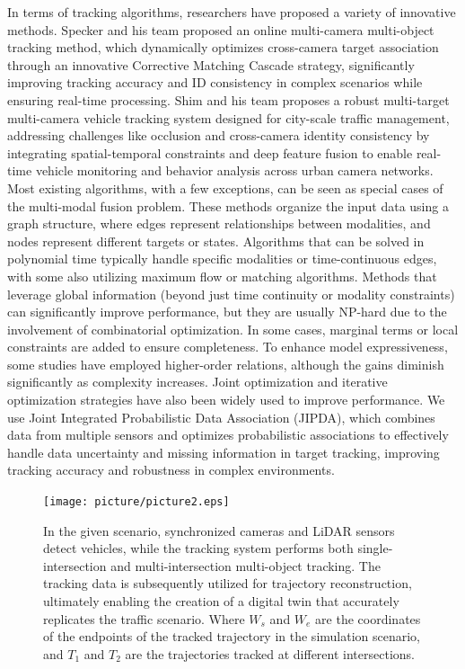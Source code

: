 \documentclass[journal,twoside,web]{ieeecolor}
\begin{document}
In terms of tracking algorithms, researchers have proposed a variety of innovative methods.
Specker and his team proposed an online multi-camera multi-object tracking method, which dynamically optimizes cross-camera target association through an innovative Corrective Matching Cascade strategy, significantly improving tracking accuracy and ID consistency in complex scenarios while ensuring real-time processing\cite{Alpher24e}.
Shim and his team proposes a robust multi-target multi-camera vehicle tracking system designed for city-scale traffic management, addressing challenges like occlusion and cross-camera identity consistency by integrating spatial-temporal constraints and deep feature fusion to enable real-time vehicle monitoring and behavior analysis across urban camera networks\cite{Alpher21e}.
Most existing algorithms, with a few exceptions, can be seen as special cases of the multi-modal fusion problem. 
These methods organize the input data using a graph structure, where edges represent relationships between modalities, and nodes represent different targets or states. 
Algorithms that can be solved in polynomial time typically handle specific modalities or time-continuous edges, with some also utilizing maximum flow or matching algorithms. 
Methods that leverage global information (beyond just time continuity or modality constraints) can significantly improve performance, but they are usually NP-hard due to the involvement of combinatorial optimization. 
In some cases, marginal terms or local constraints are added to ensure completeness. 
To enhance model expressiveness, some studies have employed higher-order relations, although the gains diminish significantly as complexity increases. 
Joint optimization and iterative optimization strategies have also been widely used to improve performance.
We use Joint Integrated Probabilistic Data Association (JIPDA), which combines data from multiple sensors and optimizes probabilistic associations to effectively handle data uncertainty and missing information in target tracking, improving tracking accuracy and robustness in complex environments.

\begin{figure}[t]
	\centerline{\texttt{[image: picture/picture2.eps]}}
	\caption{In the given scenario, synchronized cameras and LiDAR sensors detect vehicles, while the tracking system performs both single-intersection and multi-intersection multi-object tracking. The tracking data is subsequently utilized for trajectory reconstruction, ultimately enabling the creation of a digital twin that accurately replicates the traffic scenario. Where \(W_{s}\) and \(W_{e}\) are the coordinates of the endpoints of the tracked trajectory in the simulation scenario, and \(T_{1}\) and \(T_{2}\) are the trajectories tracked at different intersections.}
	\label{fig2}
\end{figure}
\end{document}
